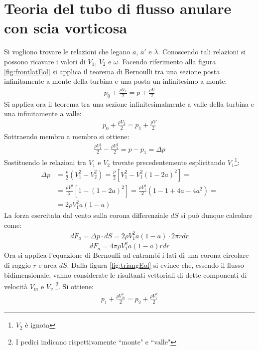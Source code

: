 \section{Teoria del tubo di flusso anulare con scia vorticosa}
Si vogliono trovare le relazioni che legano $a$, $a'$ e $\lambda$. Conoscendo tali relazioni si possono ricavare i valori di $V_1$, $V_2$ e $\omega$. Facendo riferimento alla figura \ref{fig:frontlatEol} si applica il teorema di Bernoulli tra una sezione posta infinitamente a monte della turbina e una posta un infinitesimo a monte:
\begin{align*}
p_0 + \frac{\rho V_1}{2} = p + \frac{\rho V}{2}
\end{align*}
Si applica ora il teorema tra una sezione infinitesimalmente a valle della turbina e una infinitamente a valle:
\begin{align*}
p_0 + \frac{\rho V_2}{2} = p_1 + \frac{\rho V}{2}
\end{align*}
Sottraendo membro a membro si ottiene:
\begin{align*}
\frac{\rho V_1^2}{2} - \frac{\rho V_2^2}{2} = p - p_1 = \Delta p
\end{align*}
Sostituendo le relazioni tra $V_1$ e $V_2$ trovate precedentemente esplicitando $V_1$\footnote{$V_2$ è ignota}:
\begin{align*}
\Delta p &= \frac{\rho}{2} \left(V_1^2 - V_2^2 \right) = \frac{\rho}{2} \left[ V_1^2 - V_1^2 \left(1-2a \right)^2 \right]=\\
&= \frac{\rho V_1^2}{2} \left[ 1- \left( 1- 2a \right)^2 \right] = \frac{\rho V_1^2}{2} \left( 1- 1+4a-4a^2 \right)=\\
&= 2 \rho V_1^2 a \left( 1-a \right)
\end{align*}
La forza esercitata dal vento sulla corona differenziale $dS$ si può dunque calcolare come:
\begin{align*}
dF_a = \Delta p \cdot dS = 2 \rho V_1^2 a \left( 1-a \right) \cdot 2 \pi r dr
\end{align*}
\begin{equation}\label{eq:forza1}
dF_a = 4 \pi \rho	V_1^2 a \left( 1-a \right) r dr
\end{equation}
Ora si applica l'equazione di Bernoulli ad entrambi i lati di una corona circolare di raggio $r$ e area $dS$. Dalla figura \ref{fig:triangEol} si evince che, essendo il flusso bidimensionale, vanno considerate le risultanti vettoriali di dette componenti di velocità $V_m$ e $V_v$ \footnote{I pedici indicano rispettivamente ``monte" e ``valle"}. Si ottiene:
\begin{align*}
p_1 + \frac{\rho V_m^2}{2} = p_2 + \frac{\rho V_v^2}{2}
\end{align*}
